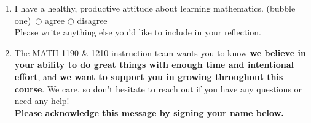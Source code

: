 \documentclass[10pt]{article}
\begin{document}
\begin{enumerate}
    \vfill

\item I have a healthy, productive attitude about learning mathematics. (bubble one) \,\hfill $\bigcirc$ agree \hfill $\bigcirc$ disagree \hfill\,\\[0.1in]
%
Please write anything else you'd like to include in your reflection.

    \vfill

\item The MATH 1190 \& 1210 instruction team wants you to know {\bf we believe in your ability to do great things with enough time and intentional effort}, and {\bf we want to support you in growing throughout this course}. We care, so don't hesitate to reach out if you have any questions or need any help!\\ 

{\bf Please acknowledge this message by signing your name below.}\\[0.5in]
    
\end{enumerate}
\end{document}
